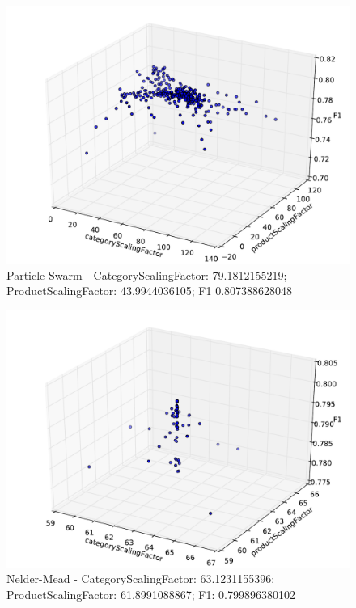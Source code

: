\documentclass{article}
\begin{document}
\begin{figure}[!htb]
\centering
\includegraphics[width=\textwidth]{eclipse/ps_eclipse.pdf}
\caption{Particle Swarm - CategoryScalingFactor: 79.1812155219; ProductScalingFactor: 43.9944036105; F1 0.807388628048 }
\label{fig:EParticle-Swarm}
\end{figure}

\begin{figure}[!htb]
\centering
\includegraphics[width=\textwidth]{eclipse/nm_eclipse.pdf}
\caption{Nelder-Mead - CategoryScalingFactor: 63.1231155396; ProductScalingFactor: 61.8991088867; F1: 0.799896380102}
\label{fig:ENelder-Mead}
\end{figure}
\end{document}
